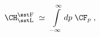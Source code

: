 \begin{equation}\label{decFP}
\CH^{\rm\sst F}_{\rm\sst L}\;\simeq\;\, \int\limits_{-\infty}^{\infty}dp
\;\CF_p\;,
\end{equation}

